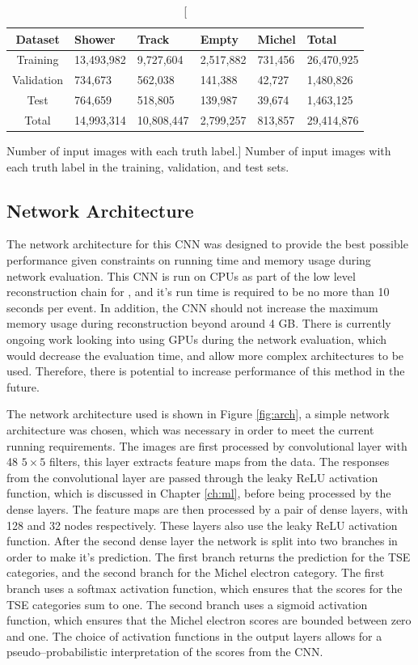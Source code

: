 \begin{table}
	\centering
	\bgroup
	\def\arraystretch{1.5}
	\begin{tabularx}{\textwidth}{@{}c|Y|Y|Y|Y|Y@{}}
		Dataset    & Shower     & Track      & Empty     & Michel  & Total      \\ \hline
		Training   & 13,493,982 & 9,727,604  & 2,517,882 & 731,456 & 26,470,925 \\
		Validation & 734,673    & 562,038    & 141,388   & 42,727  & 1,480,826  \\
		Test       & 764,659    & 518,805    & 139,987   & 39,674  & 1,463,125  \\ \hline
		Total      & 14,993,314 & 10,808,447 & 2,799,257 & 813,857 & 29,414,876
	\end{tabularx}
	\egroup
	\caption
	[Number of input images with each truth label.]
	{Number of input images with each truth label in the training, validation, and
	test sets.}
	\label{tab:patches}
\end{table}

\subsection{Network Architecture}

The network architecture for this CNN was designed to provide the best possible
performance given constraints on running time and memory usage during network
evaluation. This CNN is run on CPUs as part of the low level reconstruction 
chain for \protodune{}, and it's run time is required to be no more than 10 
seconds per event. In addition, the CNN should not increase the maximum memory 
usage during reconstruction beyond around 4 GB. There is currently ongoing 
work looking into using GPUs during the network evaluation, which would decrease
the evaluation time, and allow more complex architectures to be used. 
Therefore, there is potential to increase performance of this method in the 
future.

The network architecture used is shown in Figure \ref{fig:arch}, a simple
network architecture was chosen, which was necessary in order to meet the 
current running requirements. The images are first processed by convolutional 
layer with 48 $5 \times 5$ filters, this layer extracts feature maps from the 
data. The responses from the convolutional layer are passed through the leaky 
ReLU activation function, which is discussed in Chapter \ref{ch:ml}, before 
being processed by the dense layers. The feature maps are then processed by a 
pair of dense layers, with 128 and 32 nodes respectively. These layers also 
use the leaky ReLU activation function. After the second dense layer the 
network is split into two branches in order to make it's prediction. The first 
branch returns the prediction for the TSE categories, and the second branch 
for the Michel electron category. The first branch uses a softmax activation 
function, which ensures that the scores for the TSE categories sum to one.  
The second branch uses a sigmoid activation function, which ensures that the 
Michel electron scores are bounded between zero and one. The choice of 
activation functions in the output layers allows for a pseudo--probabilistic 
interpretation of the scores from the CNN.

